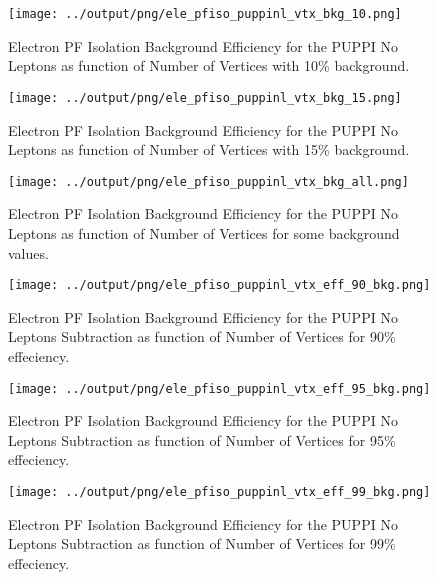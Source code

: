 \documentclass[11pt]{book}
\begin{document}
\begin{figure}[htb]
\centering
\texttt{[image: ../output/png/ele\_pfiso\_puppinl\_vtx\_bkg\_10.png]}
\caption{Electron PF Isolation Background Efficiency for the PUPPI No Leptons as function of Number of Vertices with 10\% background.}
\label{fig:ele_pfiso_vtx_bkg_puppinl_bkg_10}
\end{figure}

\begin{figure}[htb]
\centering
\texttt{[image: ../output/png/ele\_pfiso\_puppinl\_vtx\_bkg\_15.png]}
\caption{Electron PF Isolation Background Efficiency for the PUPPI No Leptons as function of Number of Vertices with 15\% background.}
\label{fig:ele_pfiso_vtx_bkg_puppinl_bkg_15}
\end{figure}

\begin{figure}[htb]
\centering
\texttt{[image: ../output/png/ele\_pfiso\_puppinl\_vtx\_bkg\_all.png]}
\caption{Electron PF Isolation Background Efficiency for the PUPPI No Leptons as function of Number of Vertices for some background values.}
\label{fig:ele_pfiso_vtx_bkg_puppinl_bkg_all}
\end{figure}

\begin{figure}[htb]
\centering
\texttt{[image: ../output/png/ele\_pfiso\_puppinl\_vtx\_eff\_90\_bkg.png]}
\caption{Electron PF Isolation Background Efficiency for the PUPPI No Leptons Subtraction as function of Number of Vertices for 90\% effeciency.}
\label{fig:ele_pfiso_vtx_eff_puppinl_eff_90_bkg}
\end{figure}

\begin{figure}[htb]
\centering
\texttt{[image: ../output/png/ele\_pfiso\_puppinl\_vtx\_eff\_95\_bkg.png]}
\caption{Electron PF Isolation Background Efficiency for the PUPPI No Leptons Subtraction as function of Number of Vertices for 95\% effeciency.}
\label{fig:ele_pfiso_vtx_eff_puppinl_eff_95_bkg}
\end{figure}

\begin{figure}[htb]
\centering
\texttt{[image: ../output/png/ele\_pfiso\_puppinl\_vtx\_eff\_99\_bkg.png]}
\caption{Electron PF Isolation Background Efficiency for the PUPPI No Leptons Subtraction as function of Number of Vertices for 99\% effeciency.}
\label{fig:ele_pfiso_vtx_eff_puppinl_eff_99_bkg}
\end{figure}
\end{document}
